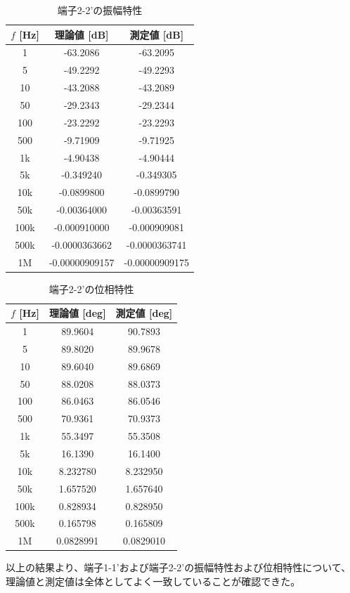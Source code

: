 \documentclass[article]{jlreq}
\begin{document}
\begin{table}[H]
\centering
\caption{端子2-2'の振幅特性}
\begin{tabular}{ccc}
\hline
$f$ [Hz] & 理論値 [dB] & 測定値 [dB] \\
\hline
1       & -63.2086   & -63.2095 \\
5       & -49.2292   & -49.2293 \\
10      & -43.2088   & -43.2089 \\
50      & -29.2343   & -29.2344 \\
100     & -23.2292   & -23.2293 \\
500     & -9.71909   & -9.71925 \\
1k      & -4.90438   & -4.90444 \\
5k      & -0.349240  & -0.349305 \\
10k     & -0.0899800 & -0.0899790 \\
50k     & -0.00364000 & -0.00363591 \\
100k    & -0.000910000 & -0.000909081 \\
500k    & -0.0000363662 & -0.0000363741 \\
1M      & -0.00000909157 & -0.00000909175 \\
\hline
\end{tabular}
\end{table}
\begin{table}[H]
\centering
\caption{端子2-2'の位相特性}
\begin{tabular}{ccc}
\hline
$f$ [Hz] & 理論値 [deg] & 測定値 [deg] \\
\hline
1       & 89.9604   & 90.7893 \\
5       & 89.8020   & 89.9678 \\
10      & 89.6040   & 89.6869 \\
50      & 88.0208   & 88.0373 \\
100     & 86.0463   & 86.0546 \\
500     & 70.9361   & 70.9373 \\
1k      & 55.3497   & 55.3508 \\
5k      & 16.1390   & 16.1400 \\
10k     & 8.232780  & 8.232950 \\
50k     & 1.657520  & 1.657640 \\
100k    & 0.828934  & 0.828950 \\
500k    & 0.165798  & 0.165809 \\
1M      & 0.0828991 & 0.0829010 \\
\hline
\end{tabular}
\end{table}
以上の結果より、端子1-1'および端子2-2'の振幅特性および位相特性について、
理論値と測定値は全体としてよく一致していることが確認できた。
\end{document}
